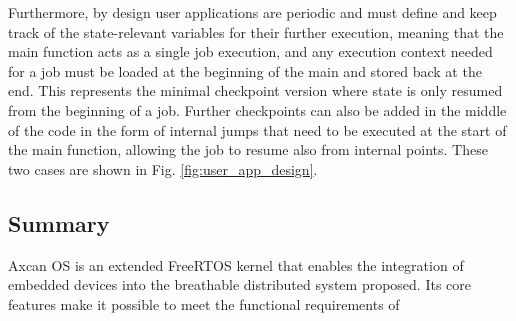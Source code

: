 Furthermore, by design user applications are periodic and must define and keep track of the state-relevant variables for their further execution, meaning that the main function acts as a single job execution, and any execution context needed for a job must be loaded at the beginning of the main and stored back at the end. This represents the minimal checkpoint version where state is only resumed from the beginning of a job. Further checkpoints can also be added in the middle of the code in the form of internal jumps that need to be executed at the start of the main function, allowing the job to resume also from internal points. These two cases are shown in Fig. \ref{fig:user_app_design}.

\subsection{Summary}
Axcan OS is an extended FreeRTOS kernel that enables the integration of embedded devices into the breathable distributed system proposed. Its core features make it possible to meet the functional requirements of 
